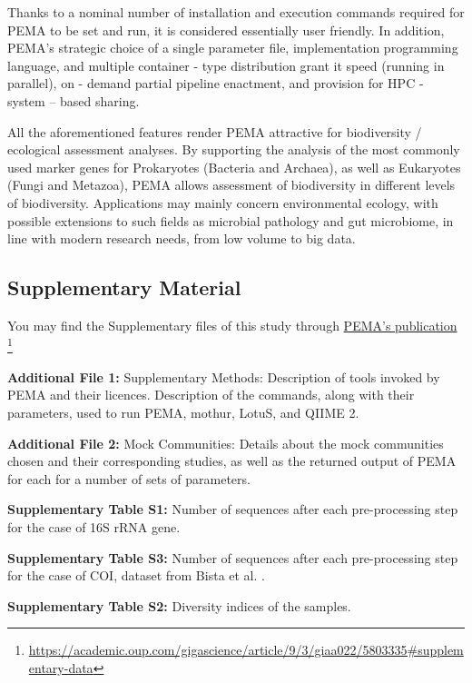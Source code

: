    Thanks to a nominal number of installation and execution commands required for PEMA to be set and run, it is considered essentially user friendly. 
   In addition, PEMA's strategic choice of a single parameter file, implementation programming language, and multiple container - type distribution grant it speed (running in parallel), on - demand partial pipeline enactment, and provision for HPC - system – based sharing.

   All the aforementioned features render PEMA attractive for biodiversity / ecological assessment analyses. 
   By supporting the analysis of the most commonly used marker genes for Prokaryotes (Bacteria and Archaea), as well as Eukaryotes (Fungi and Metazoa), PEMA allows assessment of biodiversity in different levels of biodiversity. 
   Applications may mainly concern environmental ecology, with possible extensions to such fields as microbial pathology and gut microbiome, in line with modern research needs, from low volume to big data.



   \subsection{Supplementary Material}

   You may find the Supplementary files of this study through 
   \href{https://academic.oup.com/gigascience/article/9/3/giaa022/5803335#supplementary-data}{PEMA's publication}
   \footnote{\href{https://academic.oup.com/gigascience/article/9/3/giaa022/5803335\#supplementary-data}{https://academic.oup.com/gigascience/article/9/3/giaa022/5803335\#supplementary-data}}


\textbf{Additional File 1:} Supplementary Methods: Description of tools invoked by PEMA and their licences. Description of the commands, along with their parameters, used to run PEMA, mothur, LotuS, and QIIME 2.

\textbf{Additional File 2:} Mock Communities: Details about the mock communities chosen and their corresponding studies, as well as the returned output of PEMA for each for a number of sets of parameters.

\textbf{Supplementary Table S1:} Number of sequences after each pre-processing step for the case of 16S rRNA gene.

\textbf{Supplementary Table S3:} Number of sequences after each pre-processing step for the case of COI, dataset from Bista et al. \citep{bista2017annual}.

\textbf{Supplementary Table S2:} Diversity indices of the samples.

